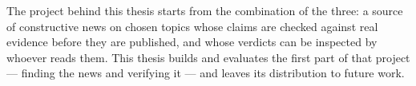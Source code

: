 The project behind this thesis starts from the combination of the
three: a source of constructive news on chosen topics whose claims are
checked against real evidence before they are published, and whose
verdicts can be inspected by whoever reads them. This thesis builds
and evaluates the first part of that project --- finding the news and
verifying it --- and leaves its distribution to future work.
